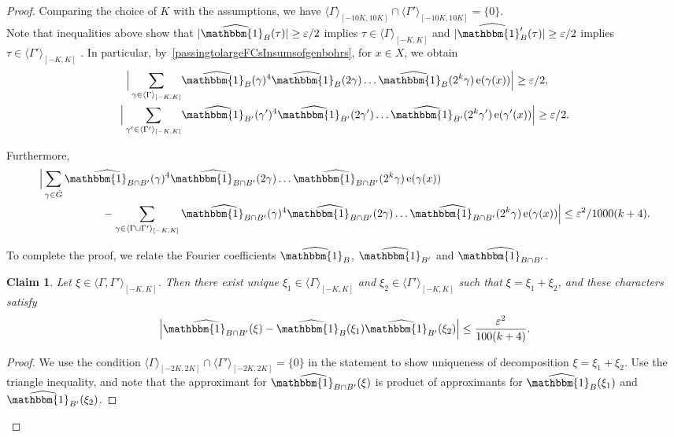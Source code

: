 \documentclass[a4paper,11pt]{article}
\numberwithin{theorem}{section}
\newtheorem{claim}[theorem]{Claim}
\theoremstyle{definition}
\newcommand\id{\mathbbm{1}}
\newcommand{\on}[1]{
	\operatorname{#1}
}
\begin{document}
\begin{proof}
    Comparing the choice of $K$ with the assumptions, we have $\langle\Gamma\rangle_{[-10K, 10K]} \cap \langle\Gamma'\rangle_{[-10K, 10K]} = \{0\}$.\\
    
    Note that inequalities above show that $|\widehat{\id_B}(\tau)| \geq \varepsilon/2$ implies $\tau \in \langle \Gamma \rangle_{[-K, K]}$ and $|\widehat{\id_B'}(\tau)| \geq \varepsilon/2$ implies $\tau \in \langle \Gamma' \rangle_{[-K, K]}$ . In particular, by~\eqref{passingtolargeFCsInsumsofgenbohrs}, for $x \in X$, we obtain 
    \begin{align*}\Big|\sum_{\gamma \in \langle \Gamma \rangle_{[-K, K]}} &\widehat{\id_B}(\gamma)^4 \widehat{\id_B}(2\gamma)\dots \widehat{\id_B}(2^k\gamma)\on{e}(\gamma(x))\Big| \geq \varepsilon/2,\\
    \Big|\sum_{\gamma' \in \langle \Gamma' \rangle_{[-K, K]}} &\widehat{\id_{B'}}(\gamma')^4 \widehat{\id_{B'}}(2\gamma')\dots \widehat{\id_{B'}}(2^k\gamma')\on{e}(\gamma'(x))\Big| \geq \varepsilon/2.\end{align*}

    Furthermore, 
    \begin{align*}&\Big|\sum_{\gamma \in \hat{G}} \widehat{\id_{B \cap B'}}(\gamma)^4 \widehat{\id_{B \cap B'}}(2\gamma)\dots \widehat{\id_{B \cap B'}}(2^k\gamma)\on{e}(\gamma(x)) \\
    &\hspace{2cm}- \sum_{\gamma \in \langle \Gamma \cup \Gamma'\rangle_{[-K, K]}} \widehat{\id_{B \cap B'}}(\gamma)^4 \widehat{\id_{B \cap B'}}(2\gamma)\dots \widehat{\id_{B \cap B'}}(2^k\gamma)\on{e}(\gamma(x))\Big| \leq \varepsilon^2/1000(k+4).\end{align*}

    To complete the proof, we relate the Fourier coefficients $\widehat{\id_{B}}$, $\widehat{\id_{B'}}$ and $\widehat{\id_{B \cap B'}}$.

    \begin{claim}
        Let $\xi \in \langle \Gamma, \Gamma' \rangle_{[-K, K]}$. Then there exist unique $\xi_1 \in \langle \Gamma \rangle_{[-K, K]}$ and $\xi_2 \in \langle \Gamma' \rangle_{[-K, K]}$ such that $\xi = \xi_1 + \xi_2$, and these characters satisfy
        \[\Big| \widehat{\id_{B \cap B'}}(\xi) -\widehat{\id_{B}}(\xi_1) \widehat{\id_{B'}}(\xi_2)\Big| \leq \frac{\varepsilon^2}{100(k + 4)}.\]
    \end{claim}

    \begin{proof}
        We use the condition $\langle\Gamma\rangle_{[-2K, 2K]} \cap \langle\Gamma'\rangle_{[-2K, 2K]} = \{0\}$  in the statement to show uniqueness of decomposition $\xi = \xi_1 + \xi_2$. Use the triangle inequality, and note that the approximant for $\widehat{\id_{B \cap B'}}(\xi)$ is product of approximants for $\widehat{\id_{B}}(\xi_1)$ and $\widehat{\id_{B'}}(\xi_2)$.
    \end{proof}


\end{proof}
\end{document}

